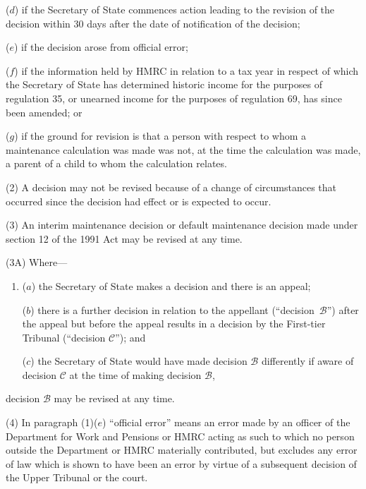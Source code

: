 \documentclass[12pt,a4paper]{article}
\begin{document}
\begin{enumerate}
($d$) if the Secretary of State commences action leading to the revision of the decision within 30 days after the date of notification of the decision;

($e$) if the decision arose from official error;

($f$) if the information held by HMRC in relation to a tax year in respect of which the Secretary of State has determined historic income for the purposes of regulation 35, or unearned income for the purposes of regulation 69, has since been amended; or

($g$) if the ground for revision is that a person with respect to whom a maintenance calculation was made was not, at the time the calculation was made, a parent of a child to whom the calculation relates.
\end{enumerate}

(2) A decision may not be revised because of a change of circumstances that occurred since the decision had effect or is expected to occur.

(3) An interim maintenance decision or default maintenance decision made under section 12 of the 1991 Act may be revised at any time.

(3A) Where—
\begin{enumerate}\item[]
($a$) the Secretary of State makes a decision and there is an appeal;

($b$) there is a further decision in relation to the appellant (“decision~$\mathcal{B}$”) after the appeal but before the appeal results in a decision by the First-tier Tribunal (“decision $\mathcal{C}$”); and

($c$) the Secretary of State would have made decision $\mathcal{B}$ differently if aware of decision $\mathcal{C}$ at the time of making decision $\mathcal{B}$,
\end{enumerate}
decision $\mathcal{B}$ may be revised at any time.

(4) In paragraph (1)($e$)  “official error” means an error made by an officer of the Department for Work and Pensions or HMRC acting as such to which no person outside the Department or HMRC materially contributed, but excludes any error of law which is shown to have been an error by virtue of a subsequent decision of the Upper Tribunal or the court.

\end{document}
